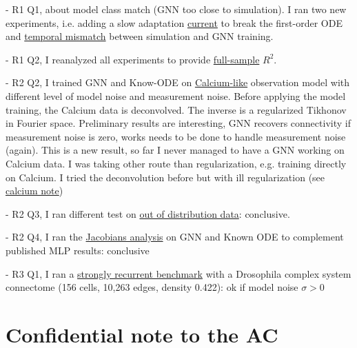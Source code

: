 \documentclass[11pt]{article}
\begin{document}

- R1 Q1, about model class match (GNN too close to simulation). I ran two new experiments, i.e. adding a slow adaptation \hyperref[link3]{current} to break the first-order ODE and \hyperref[link4]{temporal mismatch} between simulation and GNN training.

- R1 Q2, I reanalyzed all experiments to provide \hyperref[link4]{full-sample} $R^2$.

- R2 Q2, I trained GNN and Know-ODE on \hyperref[link5]{Calcium-like} observation model with different level of model noise and measurement noise. Before applying the model training, the Calcium data is deconvolved. The inverse is a regularized Tikhonov in Fourier space. Preliminary results are interesting, GNN recovers connectivity if measurement noise is zero, works needs to be done to handle measurement noise (again). This is a new result, so far I never managed to have a GNN working on Calcium data. I was taking other route than regularization, e.g. training directly on Calcium. I tried the deconvolution before but with ill regularization (see \href{https://github.com/.../calcium_note.pdf}{calcium note})  

- R2 Q3, I ran different test on \hyperref[link6]{out of distribution data}: conclusive.

- R2 Q4, I ran the \hyperref[link7]{Jacobians analysis} on GNN and Known ODE to complement published MLP results: conclusive  

- R3 Q1, I ran a \hyperref[link8]{strongly recurrent benchmark} with a Drosophila complex system connectome (156 cells, 10,263 edges, density 0.422): ok if model noise $\sigma >0$
\\
\newline
\newline

\section{Confidential note to the AC}
\end{document}
